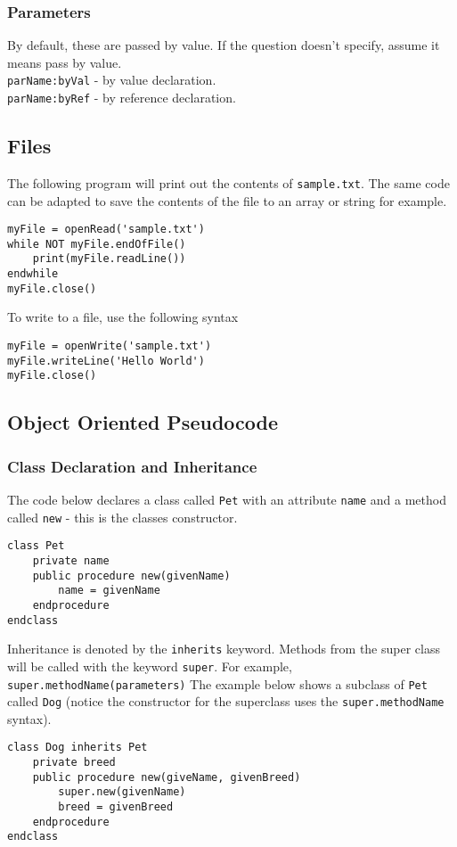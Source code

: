 \documentclass[a4paper,11pt]{article}
\begin{document}
\subsubsection{Parameters}
By default, these are passed by value. If the question doesn't specify, assume it means pass by value.\\
\verb|parName:byVal| - by value declaration.\\
\verb|parName:byRef| - by reference declaration.
\subsection{Files}
The following program will print out the contents of \verb|sample.txt|. The same code can be adapted to save the contents of the file to an array or string for example. 
\begin{Verbatim}[breaklines=true, breakanywhere=true]
myFile = openRead('sample.txt')
while NOT myFile.endOfFile()
    print(myFile.readLine())
endwhile
myFile.close()
\end{Verbatim}
To write to a file, use the following syntax
\begin{Verbatim}[breaklines=true, breakanywhere=true]
myFile = openWrite('sample.txt')
myFile.writeLine('Hello World')
myFile.close()
\end{Verbatim}
\subsection{Object Oriented Pseudocode}
\subsubsection{Class Declaration and Inheritance}
The code below declares a class called \verb|Pet| with an attribute \verb|name| and a method called \verb|new| - this is the classes constructor.
\begin{Verbatim}[breaklines=true, breakanywhere=true]
class Pet
    private name
    public procedure new(givenName)
        name = givenName
    endprocedure
endclass
\end{Verbatim}
Inheritance is denoted by the \verb|inherits| keyword. Methods from the super class will be called with the keyword \verb|super|. For example, \verb|super.methodName(parameters)| The example below shows a subclass of \verb|Pet| called \verb|Dog| (notice the constructor for the superclass uses the \verb|super.methodName| syntax).\\
\begin{Verbatim}[breaklines=true, breakanywhere=true]
class Dog inherits Pet
    private breed
    public procedure new(giveName, givenBreed)
        super.new(givenName)
        breed = givenBreed
    endprocedure
endclass
\end{Verbatim}
\end{document}
